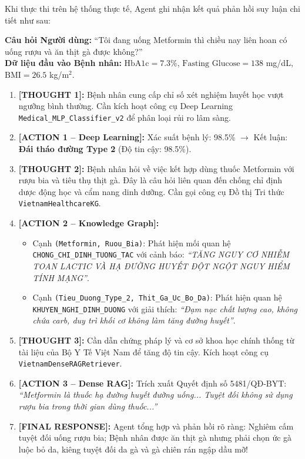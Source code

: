 \documentclass[12pt,a4paper]{report}
\begin{document}
Khi thực thi trên hệ thống thực tế, Agent ghi nhận kết quả phản hồi suy luận chi tiết như sau:

\begin{tcolorbox}[colback=blue!5!white,colframe=blue!75!black,title=Nhật Ký Suy Luận ReAct Thực Tế: Kịch Bản Y Tế Bệnh Tiểu Đường]
\textbf{Câu hỏi Người dùng:} “Tôi đang uống Metformin thì chiều nay liên hoan có uống rượu và ăn thịt gà được không?” \\
\textbf{Dữ liệu đầu vào Bệnh nhân:} $\text{HbA1c} = 7.3\%$, $\text{Fasting Glucose} = 138$ mg/dL, $\text{BMI} = 26.5$ kg/m$^2$.
\begin{enumerate}
    \item \textbf{[THOUGHT 1]:} Bệnh nhân cung cấp chỉ số xét nghiệm huyết học vượt ngưỡng bình thường. Cần kích hoạt công cụ Deep Learning \texttt{Medical\_MLP\_Classifier\_v2} để phân loại rủi ro lâm sàng.
    \item \textbf{[ACTION 1 -- Deep Learning]:} Xác suất bệnh lý: 98.5\% $\to$ Kết luận: \textbf{Đái tháo đường Type 2} (Độ tin cậy: 98.5\%).
    \item \textbf{[THOUGHT 2]:} Bệnh nhân hỏi về việc kết hợp dùng thuốc Metformin với rượu bia và tiêu thụ thịt gà. Đây là câu hỏi liên quan đến chống chỉ định dược động học và cẩm nang dinh dưỡng. Cần gọi công cụ Đồ thị Tri thức \texttt{VietnamHealthcareKG}.
    \item \textbf{[ACTION 2 -- Knowledge Graph]:}
    \begin{itemize}
        \item Cạnh \texttt{(Metformin, Ruou\_Bia)}: Phát hiện mối quan hệ \texttt{CHONG\_CHI\_DINH\_TUONG\_TAC} với cảnh báo: \textit{“TĂNG NGUY CƠ NHIỄM TOAN LACTIC VÀ HẠ ĐƯỜNG HUYẾT ĐỘT NGỘT NGUY HIỂM TÍNH MẠNG”}.
        \item Cạnh \texttt{(Tieu\_Duong\_Type\_2, Thit\_Ga\_Uc\_Bo\_Da)}: Phát hiện quan hệ \texttt{KHUYEN\_NGHI\_DINH\_DUONG} với giải thích: \textit{“Đạm nạc chất lượng cao, không chứa carb, duy trì khối cơ không làm tăng đường huyết”}.
    \end{itemize}
    \item \textbf{[THOUGHT 3]:} Cần dẫn chứng pháp lý và cơ sở khoa học chính thống từ tài liệu của Bộ Y Tế Việt Nam để tăng độ tin cậy. Kích hoạt công cụ \texttt{VietnamDenseRAGRetriever}.
    \item \textbf{[ACTION 3 -- Dense RAG]:} Trích xuất Quyết định số 5481/QĐ-BYT: \textit{“Metformin là thuốc hạ đường huyết đường uống... Tuyệt đối không sử dụng rượu bia trong thời gian dùng thuốc...”}
    \item \textbf{[FINAL RESPONSE]:} Agent tổng hợp và phản hồi rõ ràng: Nghiêm cấm tuyệt đối uống rượu bia; Bệnh nhân được ăn thịt gà nhưng phải chọn ức gà luộc bỏ da, kiêng tuyệt đối da gà và gà chiên rán ngập dầu mỡ!
\end{enumerate}
\end{tcolorbox}
\end{document}
